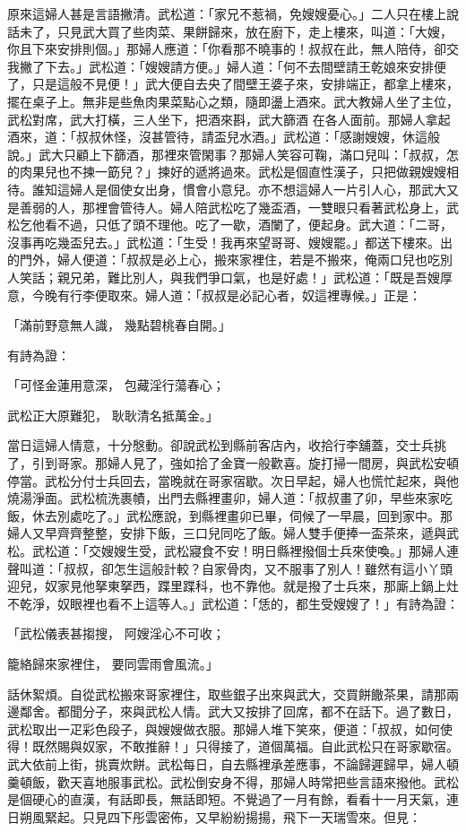 \begin{showcontents}{}
原來這婦人甚是言語撇清。武松道：「家兄不惹禍，免嫂嫂憂心。」二人只在樓上說話未了，只見武大買了些肉菜、果餅歸來，放在廚下，走上樓來，叫道：「大嫂，你且下來安排則個。」那婦人應道：「你看那不曉事的！叔叔在此，無人陪侍，卻交我撇了下去。」武松道：「嫂嫂請方便。」婦人道：「何不去間壁請王乾娘來安排便了，只是這般不見便！」武大便自去央了間壁王婆子來，安排端正，都拿上樓來，擺在桌子上。無非是些魚肉果菜點心之類，隨即盪上酒來。武大教婦人坐了主位，武松對席，武大打橫，三人坐下，把酒來斟，武大篩酒 在各人面前。那婦人拿起酒來，道：「叔叔休怪，沒甚管待，請盃兒水酒。」武松道：「感謝嫂嫂，休這般說。」武大只顧上下篩酒，那裡來管閑事？那婦人笑容可鞠，滿口兒叫：「叔叔，怎的肉果兒也不揀一筯兒？」揀好的遞將過來。武松是個直性漢子，只把做親嫂嫂相待。誰知這婦人是個使女出身，慣會小意兒。亦不想這婦人一片引人心，那武大又是善弱的人，那裡會管待人。婦人陪武松吃了幾盃酒，一雙眼只看著武松身上，武松乞他看不過，只低了頭不理他。吃了一歇，酒闌了，便起身。武大道：「二哥，沒事再吃幾盃兒去。」武松道：「生受！我再來望哥哥、嫂嫂罷。」都送下樓來。出的門外，婦人便道：「叔叔是必上心，搬來家裡住，若是不搬來，俺兩口兒也吃別人笑話；親兄弟，難比別人，與我們爭口氣，也是好處！」武松道：「既是吾嫂厚意，今晚有行李便取來。婦人道：「叔叔是必記心者，奴這裡專候。」正是：

「滿前野意無人識，  幾點碧桃春自開。」

有詩為證：

「可怪金蓮用意深，  包藏淫行蕩春心；

武松正大原難犯，  耿耿清名抵萬金。」

當日這婦人情意，十分慇動。卻說武松到縣前客店內，收拾行李舖蓋，交士兵挑了，引到哥家。那婦人見了，強如拾了金寶一般歡喜。旋打掃一間房，與武松安頓停當。武松分付士兵回去，當晚就在哥家宿歇。次日早起，婦人也慌忙起來，與他燒湯淨面。武松梳洗裹幘，出門去縣裡畫卯，婦人道：「叔叔畫了卯，早些來家吃飯，休去別處吃了。」武松應說，到縣裡畫卯已畢，伺候了一早晨，回到家中。那婦人又早齊齊整整，安排下飯，三口兒同吃了飯。婦人雙手便捧一盃茶來，遞與武松。武松道：「交嫂嫂生受，武松寢食不安！明日縣裡撥個士兵來使喚。」那婦人連聲叫道：「叔叔，卻怎生這般計較？自家骨肉，又不服事了別人！雖然有這小丫頭迎兒，奴家見他拏東拏西，蹀里蹀科，也不靠他。就是撥了士兵來，那廝上鍋上灶不乾淨，奴眼裡也看不上這等人。」武松道：「恁的，都生受嫂嫂了！」有詩為證：

「武松儀表甚搊搜，  阿嫂淫心不可收；

籠絡歸來家裡住，  要同雲雨會風流。」

話休絮煩。自從武松搬來哥家裡住，取些銀子出來與武大，交買餅饊茶果，請那兩邊鄰舍。都聞分子，來與武松人情。武大又按排了回席，都不在話下。過了數日，武松取出一疋彩色段子，與嫂嫂做衣服。那婦人堆下笑來，便道：「叔叔，如何使得！既然賜與奴家，不敢推辭！」只得接了，道個萬福。自此武松只在哥家歇宿。武大依前上街，挑賣炊餅。武松每日，自去縣裡承差應事，不論歸遲歸早，婦人頓羹頓飯，歡天喜地服事武松。武松倒安身不得，那婦人時常把些言語來撥他。武松是個硬心的直漢，有話即長，無話即短。不覺過了一月有餘，看看十一月天氣，連日朔風緊起。只見四下彤雲密佈，又早紛紛揚揚，飛下一天瑞雪來。但見：


\end{showcontents}
